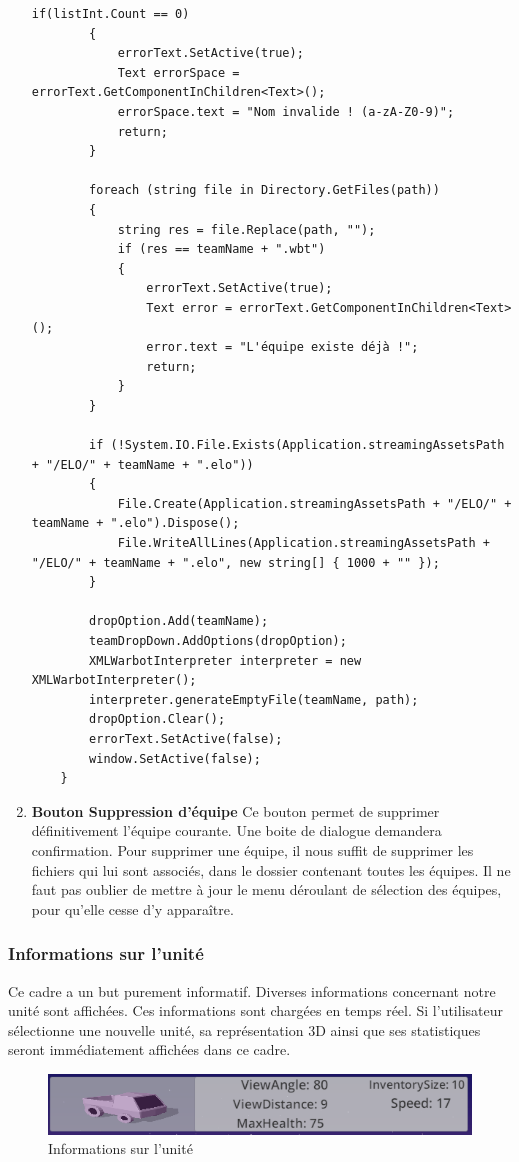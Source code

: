 \documentclass{report}
\begin{document}
\begin{enumerate}[label=\Alph*)]
\begin{lstlisting}[language={[Sharp]C},label={lst:validateName()}, caption= Extrait du code de CreateTeam.cs]
        if(listInt.Count == 0)
        {
            errorText.SetActive(true);
            Text errorSpace = errorText.GetComponentInChildren<Text>();
            errorSpace.text = "Nom invalide ! (a-zA-Z0-9)";
            return;
        }

        foreach (string file in Directory.GetFiles(path))
        {
            string res = file.Replace(path, "");
            if (res == teamName + ".wbt")
            {
                errorText.SetActive(true);
                Text error = errorText.GetComponentInChildren<Text>();
                error.text = "L'équipe existe déjà !";
                return;
            }
        }

        if (!System.IO.File.Exists(Application.streamingAssetsPath + "/ELO/" + teamName + ".elo"))
        {
            File.Create(Application.streamingAssetsPath + "/ELO/" + teamName + ".elo").Dispose();
            File.WriteAllLines(Application.streamingAssetsPath + "/ELO/" + teamName + ".elo", new string[] { 1000 + "" });
        }

        dropOption.Add(teamName);
        teamDropDown.AddOptions(dropOption);
        XMLWarbotInterpreter interpreter = new XMLWarbotInterpreter();
        interpreter.generateEmptyFile(teamName, path);
        dropOption.Clear();
        errorText.SetActive(false);
        window.SetActive(false);
    }
\end{lstlisting}	

\item\textbf{Bouton Suppression d'équipe} \newline
Ce bouton permet de supprimer définitivement l'équipe courante. Une boite de dialogue demandera confirmation.
Pour supprimer une équipe, il nous suffit de supprimer les fichiers qui lui sont associés, dans le dossier contenant toutes les équipes. Il ne faut pas oublier de mettre à jour le menu déroulant de sélection des équipes, pour qu'elle cesse d'y apparaître.
\end{enumerate}


\subsubsection{Informations sur l'unité}
Ce cadre a un but purement informatif. Diverses informations concernant notre unité sont affichées. Ces informations sont chargées en temps réel.\newline
Si l'utilisateur sélectionne une nouvelle unité, sa représentation 3D ainsi que ses statistiques seront immédiatement affichées dans ce cadre.
\clearpage
\begin{figure}[h]
	\centering
		\includegraphics[scale=1]{StatsModel}
	\caption{Informations sur l'unité}
\end{figure}
\end{document}
